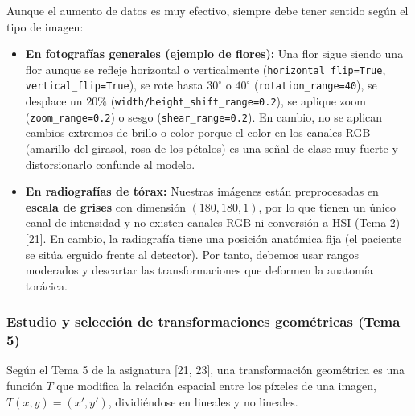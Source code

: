 \documentclass[11pt, a4paper]{article}
\numberwithin{equation}{section}
\begin{document}
Aunque el aumento de datos es muy efectivo, siempre debe tener sentido según el tipo de imagen:
\begin{itemize}
    \item \textbf{En fotografías generales (ejemplo de flores):} Una flor sigue siendo una flor aunque se refleje horizontal o verticalmente (\texttt{horizontal\_flip=True}, \texttt{vertical\_flip=True}), se rote hasta $30^\circ$ o $40^\circ$ (\texttt{rotation\_range=40}), se desplace un $20\%$ (\texttt{width/height\_shift\_range=0.2}), se aplique zoom (\texttt{zoom\_range=0.2}) o sesgo (\texttt{shear\_range=0.2}). En cambio, no se aplican cambios extremos de brillo o color porque el color en los canales RGB (amarillo del girasol, rosa de los pétalos) es una señal de clase muy fuerte y distorsionarlo confunde al modelo.
    \item \textbf{En radiografías de tórax:} Nuestras imágenes están preprocesadas en \textbf{escala de grises} con dimensión $(180, 180, 1)$, por lo que tienen un único canal de intensidad y no existen canales RGB ni conversión a HSI (Tema 2) [21]. En cambio, la radiografía tiene una posición anatómica fija (el paciente se sitúa erguido frente al detector). Por tanto, debemos usar rangos moderados y descartar las transformaciones que deformen la anatomía torácica.
\end{itemize}

\subsubsection{Estudio y selección de transformaciones geométricas (Tema 5)}
Según el Tema 5 de la asignatura [21, 23], una transformación geométrica es una función $T$ que modifica la relación espacial entre los píxeles de una imagen, $T(x,y) = (x', y')$, dividiéndose en lineales y no lineales.
\end{document}

